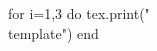 \documentclass[twoside, 10pt]{article}
\title{}
\date{}
\newcommand{\template}{
\directlua{tex.print(utils.genVersion())}
\noindent
{\large
First Name \rule{6em}{.1pt}\hspace{\stretch{1}} Last Name \rule{6em}{.1pt}\hspace{\stretch{1}} Date \rule{1.5em}{.1pt} -- \rule{1.5em}{.1pt} -- \rule{1.5em}{.1pt}\hspace{\stretch{1}} Period \rule{2em}{.1pt}\hspace{\stretch{1}} Score \rule{2em}{.1pt}
}
\vspace{1em}

\noindent\textbf{Instruction: No calculator in this action opportunity. In particular, you are required to simplify all additions and subtractions.}
\begin{enumerate}
\item ({\textbf{Be Precise}}) Score: \rule{2em}{.4pt} 
\begin{enumerate}
\item
Identify the degree, leading coefficient, and constant value of the
following polynomial:
\vspace{1em}

 $\directlua{tex.print(utils.genRandom(-10,10, false, true, true))} x^{\directlua{tex.print(utils.genRandom(1,10,false, true,true))}}\directlua{tex.print(utils.genRandom(-10,10, true, true, true))} x^{\directlua{tex.print(utils.genRandom(11,20,false, true,true))}}\directlua{tex.print(utils.genRandom(-10,10, true, true, true))} x^{\directlua{tex.print(utils.genRandom(1,10,false, true,true))}}\directlua{tex.print(utils.genRandom(-200,200, true, false, true))} $. Degree: \rule{3em}{0.4pt} Leading Coefficient: \rule{3em}{0.4pt} Constant Value: \rule{3em}{0.4pt}

 \item Write the expression in standard form:
$
 (\directlua{tex.print(utils.genRandom(-10,10, false, true, true))} x \directlua{tex.print(utils.genRandom(-10,10, true, true, true))} x^3\directlua{tex.print(utils.genRandom(-10,10, true, true, true))}x^2 ) - (\directlua{tex.print(utils.genRandom(-10,10, false, true, true))}x^2  \directlua{tex.print(utils.genRandom(-10,10, true, true, true))} x \directlua{tex.print(utils.genRandom(-10,10, true, false, true))} )
$
\vspace{1em}

\rule{20em}{0.4pt}
\item
$\log_c(c^{\directlua{tex.print(utils.genRandom(-10,10, false, true, true))} x^2 \directlua{tex.print(utils.genRandom(-10,10, true, true, true))} x}) = $ \rule{3em}{0.4pt}
\item $\sqrt[\directlua{n =utils.genRandom(1,10, false, true, 2); tex.print(n)}]{x^{\directlua{m =utils.genRandom(1,10, false, true, n); tex.print(m)}}} = x^{(\rule{2em}{0.4pt})}$
\item In the discrete exponential growth model $2026(\directlua{tex.print(utils.genRandom(1,99)/1000+1)})^t$, the growth factor is \rule{3em}{0.4pt}, and the growth rate is \rule{3em}{0.4pt} \%.
\item In the continuous exponential growth model $2025e^{\directlua{tex.print(utils.genRandom(1,99)/1000)}t}$, the growth factor is \rule{3em}{0.4pt}, and the growth rate is \rule{3em}{0.4pt}\%.
\end{enumerate}

\item ({\textbf{Argue}}) Score: \rule{2em}{.4pt} 
\begin{enumerate}
\item
Given $f(x) = \directlua{tex.print(utils.genRandom(-10,10, false, true, true))}x \directlua{tex.print(utils.genRandom(-10,10, true, false, true))}$, write the equation of $f^{-1}(x)$. \textbf{Show your work.}
\vspace{\stretch{1}}
\item  What is the solution to $ \directlua{tex.print(utils.genRandom(2,10))}\left( \directlua{tex.print(utils.genRandom(2,10))}\right)^{ \directlua{tex.print(utils.genRandom(-10,10, false, true, true))}x} =  \directlua{tex.print(utils.genRandom(1,20))}$? \textbf{Show your work, and express your answer in exact form through mathematics notation. No decimal.}
\vspace{\stretch{1}}
\end{enumerate}
\clearpage
\item ({\textbf{Model}}) Score: \rule{2em}{.4pt} 

\textbf{Choose one problem to solve:}
\begin{enumerate}
\item(\textbf{Rebuild}) Suppose the sum of two numbers is $\directlua{tex.print(utils.genRandom(-100, 100))}$. Denote one of the numbers by $x$.
\begin{enumerate}
\item Write an expression for the product of these two numbers, $P(x)$. \textbf{Show your reasoning.}
\vspace{\stretch{1}}
\item What is the product of the two numbers when $x=\directlua{tex.print(utils.genRandom(-50, 50))}$. \textbf{Show your reasoning.}
\vspace{\stretch{1}}
\item What is the reasonable domain of $P(x)$? \textbf{Show your reasoning.}
\vspace{\stretch{1}}
\end{enumerate}

\item (\textbf{Recap})
Mai wants to make an open-top box by cutting out the corners of a square piece of cardboard and folding up the sides. The cardboard is \directlua{a = utils.genRandom(10,20, false, false,false); tex.print(a)} centimeters by \directlua{tex.print(a)} centimeters. The volume $V(x)$ in cubic centimeters of the open-top box is a function of the side length $x$,
in centimeters, of the square cutouts.
\begin{enumerate}
\item Write an expression for $V(x)$. \textbf{Show your reasoning.}
\vspace{\stretch{1}}
\item What is the volume of the box when $x=\directlua{tex.print(utils.genRandom(1, math.floor(a/2) - 1))}$. \textbf{Show your reasoning.}
\vspace{\stretch{1}}
\item What is the reasonable domain of $V(x)$? \textbf{Show your reasoning.}
\vspace{\stretch{1}}
\end{enumerate}
\clearpage
\end{enumerate}
\end{enumerate}
}
\begin{document}
\begin{luacode}
for i=1,3 do
	tex.print("\\template")
end
\end{luacode}
\end{document}
